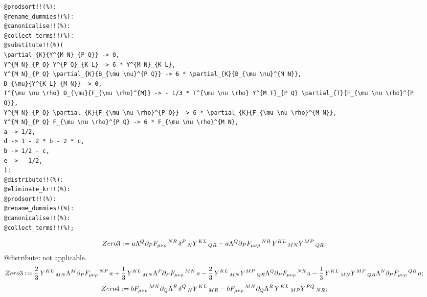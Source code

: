 \documentclass[11pt]{article}
\def\specialcolon{\mathrel{\mathop{:}}\hspace{-.5em}}
\begin{document}
{\begin{verbatim}
@prodsort!!(%):
@rename_dummies!(%):
@canonicalise!!(%):
@collect_terms!!(%):
@substitute!!(%)(
\partial_{K}{Y^{M N}_{P Q}} -> 0,
Y^{M N}_{P Q} Y^{P Q}_{K L} -> 6 * Y^{M N}_{K L},
Y^{M N}_{P Q} \partial_{K}{B_{\mu \nu}^{P Q}} -> 6 * \partial_{K}{B_{\mu \nu}^{M N}},
D_{\mu}{Y^{K L}_{M N}} -> 0,
T^{\mu \nu \rho} D_{\mu}{F_{\nu \rho}^{M}} -> - 1/3 * T^{\mu \nu \rho} Y^{M T}_{P Q} \partial_{T}{F_{\mu \nu \rho}^{P Q}},
Y^{M N}_{P Q} \partial_{K}{F_{\mu \nu \rho}^{P Q}} -> 6 * \partial_{K}{F_{\mu \nu \rho}^{M N}},
Y^{M N}_{P Q} F_{\mu \nu \rho}^{P Q} -> 6 * F_{\mu \nu \rho}^{M N},
a -> 1/2,
d -> 1 - 2 * b - 2 * c,
b -> 1/2 - c,
e -> - 1/2,
):
@distribute!!(%):
@eliminate_kr!!(%):
@prodsort!!(%):
@rename_dummies!(%):
@canonicalise!!(%):
@collect_terms!!(%);
\end{verbatim}}
\begin{dmath*}[compact, spread=2pt]
Zero3\specialcolon{}= a {\Lambda}^{Q} {\partial}_{P}{{F}_{\mu \nu \rho}\,^{N R}}\,  {\delta}^{P}\,_{N} {Y}^{K L}\,_{Q R} - a {\Lambda}^{Q} {\partial}_{P}{{F}_{\mu \nu \rho}\,^{N R}}\,  {Y}^{K L}\,_{M N} {Y}^{M P}\,_{Q R};
\end{dmath*}
@distribute: not applicable.
\begin{dmath*}[compact, spread=2pt]
Zero3\specialcolon{}= \frac{2}{3}\, {Y}^{K L}\,_{M N} {\Lambda}^{M} {\partial}_{P}{{F}_{\mu \nu \rho}\,^{N P}}\,  a + \frac{1}{3}\, {Y}^{K L}\,_{M N} {\Lambda}^{P} {\partial}_{P}{{F}_{\mu \nu \rho}\,^{M N}}\,  a - \frac{2}{3}\, {Y}^{K L}\,_{M N} {Y}^{M P}\,_{Q R} {\Lambda}^{Q} {\partial}_{P}{{F}_{\mu \nu \rho}\,^{N R}}\,  a - \frac{1}{3}\, {Y}^{K L}\,_{M N} {Y}^{M P}\,_{Q R} {\Lambda}^{N} {\partial}_{P}{{F}_{\mu \nu \rho}\,^{Q R}}\,  a;
\end{dmath*}
\begin{dmath*}[compact, spread=2pt]
Zero4\specialcolon{}= b {F}_{\mu \nu \rho}\,^{M N} {\partial}_{Q}{{\Lambda}^{R}}\,  {\delta}^{Q}\,_{N} {Y}^{K L}\,_{M R} - b {F}_{\mu \nu \rho}\,^{M N} {\partial}_{Q}{{\Lambda}^{R}}\,  {Y}^{K L}\,_{M P} {Y}^{P Q}\,_{N R};
\end{dmath*}
\end{document}
